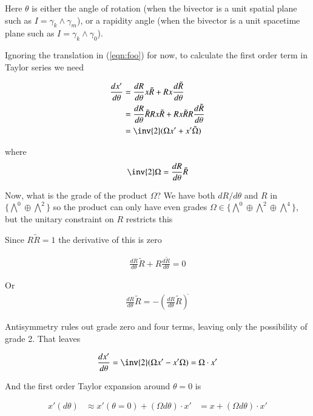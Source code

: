 \documentclass{article}
\begin{document}
Here $\theta$ is either the angle of rotation (when the bivector is a unit spatial plane such as $I = \gamma_k \wedge \gamma_m$), or a rapidity angle (when the bivector is a unit spacetime plane such as $I = \gamma_k \wedge \gamma_0$).

Ignoring the translation in (\ref{eqn:foo}) for now, to calculate the first order term in Taylor series we need

\begin{align*}
\frac{dx'}{d\theta} 
&= 
\frac{dR}{d\theta}  x \tilde{R} 
+
{R} x \frac{d\tilde{R}}{d\theta}  
\\
&= 
\frac{dR}{d\theta} \tilde{R} R x \tilde{R} 
+
{R} x \tilde{R} R \frac{d\tilde{R}}{d\theta}  
\\
&=
\inv{2} ( \Omega x' + x' \tilde{\Omega} ) \\
\end{align*}

where 
\begin{align*}
\inv{2}\Omega = \frac{dR}{d\theta} \tilde{R} 
\end{align*}

Now, what is the grade of the product $\Omega$?  We have both $dR/d\theta$ and $R$ in 
$\{\bigwedge^0 \oplus \bigwedge^2\}$
so the product can only have even grades $\Omega \in \{\bigwedge^0 \oplus \bigwedge^2 \oplus \bigwedge^4\}$, but the 
unitary constraint on $R$ restricts this

Since $R \tilde{R} = 1$ the derivative of this is zero

\begin{align*}
\frac{dR}{d\theta} \tilde{R} + {R} \frac{d\tilde{R}}{d\theta}  = 0
\end{align*}

Or
\begin{align*}
\frac{dR}{d\theta} \tilde{R} = - \left( \frac{dR}{d\theta} \tilde{R} \right)^{\tilde{}}
\end{align*}

Antisymmetry rules out grade zero and four terms, leaving only the possibility of grade 2.  That leaves

\begin{align*}
\frac{dx'}{d\theta} = \inv{2}(\Omega x' - x' \Omega) = \Omega \cdot x'
\end{align*}

And the first order Taylor expansion around $\theta =0$ is

\begin{align*}
x'(d\theta) 
&\approx x'(\theta = 0) + ( \Omega d\theta ) \cdot x'
&= x + ( \Omega d\theta ) \cdot x'
\end{align*}
\end{document}
